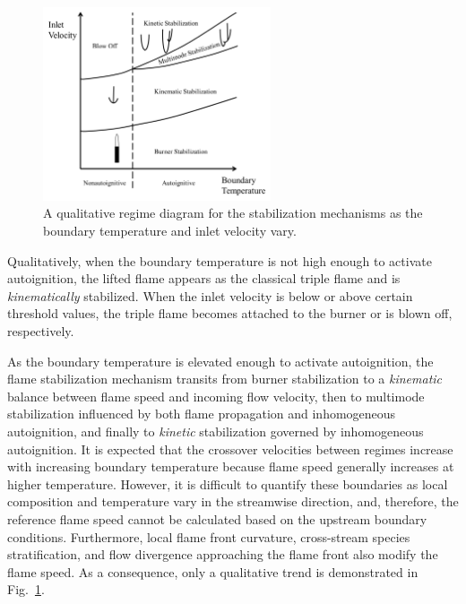 \documentclass{wssci}
\begin{document}
\begin{figure}[t]
  \centering
  \scriptsize
  \vspace{-0.1in}
  \includegraphics[width=0.6\textwidth]{2D-regime.png}
  \normalsize
  \vspace{-0.1in}
  \caption{A qualitative regime diagram for the stabilization mechanisms as the boundary temperature and inlet velocity vary. }
  \label{fig:2D-regime}
\end{figure}

Qualitatively, when the boundary temperature is not high enough to activate autoignition, the lifted flame appears as the classical triple flame and is \emph{kinematically} stabilized.  When the inlet velocity is below or above certain threshold values, the triple flame becomes attached to the burner or is blown off, respectively.  

As the boundary temperature is elevated enough to activate autoignition, the flame stabilization mechanism transits from burner stabilization to a \emph{kinematic} balance between flame speed and incoming flow velocity, then to multimode stabilization influenced by both flame propagation and inhomogeneous autoignition, and finally to \emph {kinetic} stabilization governed by inhomogeneous autoignition.  It is expected that the crossover velocities between regimes increase with increasing boundary temperature because flame speed generally increases at higher temperature.  However, it is difficult to quantify these boundaries as local composition and temperature vary in the streamwise direction, and, therefore, the reference flame speed cannot be calculated based on the upstream boundary conditions.  Furthermore, local flame front curvature, cross-stream species stratification, and flow divergence approaching the flame front also modify the flame speed.  As a consequence, only a qualitative trend is demonstrated in Fig.~\ref{fig:2D-regime}.  
\end{document}
